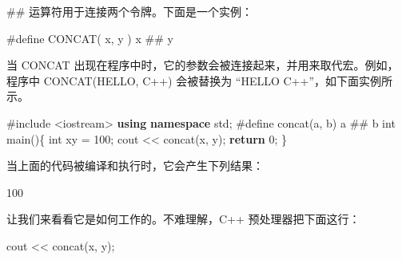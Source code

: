 \documentclass[
]{article}
\newenvironment{Shaded}{}{}
\newcommand{\ControlFlowTok}[1]{\textcolor[rgb]{0.00,0.44,0.13}{\textbf{#1}}}
\newcommand{\DataTypeTok}[1]{\textcolor[rgb]{0.56,0.13,0.00}{#1}}
\newcommand{\DecValTok}[1]{\textcolor[rgb]{0.25,0.63,0.44}{#1}}
\newcommand{\ImportTok}[1]{#1}
\newcommand{\KeywordTok}[1]{\textcolor[rgb]{0.00,0.44,0.13}{\textbf{#1}}}
\newcommand{\NormalTok}[1]{#1}
\newcommand{\OperatorTok}[1]{\textcolor[rgb]{0.40,0.40,0.40}{#1}}
\newcommand{\PreprocessorTok}[1]{\textcolor[rgb]{0.74,0.48,0.00}{#1}}
\begin{document}
\#\# 运算符用于连接两个令牌。下面是一个实例：

\begin{Shaded}
\begin{Highlighting}[]
\PreprocessorTok{\#define CONCAT}\OperatorTok{(}\PreprocessorTok{ }\NormalTok{x}\OperatorTok{,}\PreprocessorTok{ }\NormalTok{y}\PreprocessorTok{ }\OperatorTok{)}\PreprocessorTok{  }\NormalTok{x}\PreprocessorTok{ \#\# }\NormalTok{y}
\end{Highlighting}
\end{Shaded}

当 CONCAT
出现在程序中时，它的参数会被连接起来，并用来取代宏。例如，程序中
CONCAT(HELLO, C++) 会被替换为 ``HELLO C++''，如下面实例所示。

\begin{Shaded}
\begin{Highlighting}[]
\PreprocessorTok{\#include }\ImportTok{\textless{}iostream\textgreater{}}
\KeywordTok{using} \KeywordTok{namespace}\NormalTok{ std}\OperatorTok{;}
\PreprocessorTok{\#define concat}\OperatorTok{(}\NormalTok{a}\OperatorTok{,}\PreprocessorTok{ }\NormalTok{b}\OperatorTok{)}\PreprocessorTok{ }\NormalTok{a}\PreprocessorTok{ \#\# }\NormalTok{b}
\DataTypeTok{int}\NormalTok{ main}\OperatorTok{()\{}
   \DataTypeTok{int}\NormalTok{ xy }\OperatorTok{=} \DecValTok{100}\OperatorTok{;}
\NormalTok{   cout }\OperatorTok{\textless{}\textless{}}\NormalTok{ concat}\OperatorTok{(}\NormalTok{x}\OperatorTok{,}\NormalTok{ y}\OperatorTok{);}   
   \ControlFlowTok{return} \DecValTok{0}\OperatorTok{;}
\OperatorTok{\}}
\end{Highlighting}
\end{Shaded}

当上面的代码被编译和执行时，它会产生下列结果：

\begin{Shaded}
\begin{Highlighting}[]
\DecValTok{100}
\end{Highlighting}
\end{Shaded}

让我们来看看它是如何工作的。不难理解，C++ 预处理器把下面这行：

\begin{Shaded}
\begin{Highlighting}[]
\NormalTok{cout }\OperatorTok{\textless{}\textless{}}\NormalTok{ concat}\OperatorTok{(}\NormalTok{x}\OperatorTok{,}\NormalTok{ y}\OperatorTok{);}
\end{Highlighting}
\end{Shaded}
\end{document}
